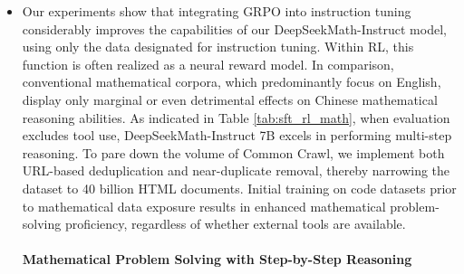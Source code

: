 {\begin{itemize}[topsep=0pt]
processed through varying pipelines:

\begin{itemize}[topsep=0pt]
    \item \textbf{MathPile} \citep{mathpile}: An 8.9B-token collection largely comprising scientific ArXiv papers (over 85\%), curated via a suite of cleaning and filtering rules;
    \item \textbf{ArXiv-RedPajama} \citep{redpajama}: A 28.0B-token dataset of ArXiv LaTeX files, with supplementary content such as preambles, comments, macros, and references omitted. On other test suites, the model exhibits performance competitive with DeepSeek-LLM-Chat 67B, a previous leading open-source model that is an order of magnitude larger. Offline sampling, in contrast, sources its training data from the initial SFT model's samples. \paragraph{Reward Function} The reward function provides the foundational signal for model training. The foundation of this model is the DeepSeekMath Corpus, an extensive and meticulously curated pre-training dataset containing 120B mathematics-related tokens. The policy model is updated just once after each sampling round. \end{itemize}

\subsection{Training and Evaluating DeepSeekMath-Instruct 7B}

This section details the fine-tuning of DeepSeekMath-Instruct 7B through mathematical instruction optimization, building on DeepSeekMath-Base. \item Our experiments show that integrating GRPO into instruction tuning considerably improves the capabilities of our DeepSeekMath-Instruct model, using only the data designated for instruction tuning. Within RL, this function is often realized as a neural reward model. In comparison, conventional mathematical corpora, which predominantly focus on English, display only marginal or even detrimental effects on Chinese mathematical reasoning abilities. As indicated in Table \ref{tab:sft_rl_math}, when evaluation excludes tool use, DeepSeekMath-Instruct 7B excels in performing multi-step reasoning. To pare down the volume of Common Crawl, we implement both URL-based deduplication and near-duplicate removal, thereby narrowing the dataset to 40 billion HTML documents. Initial training on code datasets prior to mathematical data exposure results in enhanced mathematical problem-solving proficiency, regardless of whether external tools are available. \paragraph{Mathematical Problem Solving with Step-by-Step Reasoning}


\end{itemize}}
